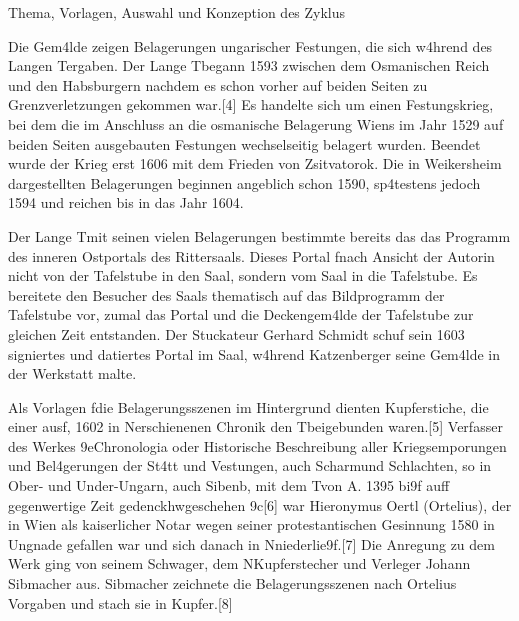 \documentclass[
  letterpaper,
]{book}
\begin{document}
Thema, Vorlagen, Auswahl und Konzeption des Zyklus

Die Gem\xa4lde zeigen Belagerungen ungarischer Festungen, die sich
w\xa4hrend des Langen T\xbcrkenkriegs ergaben. Der Lange
T\xbcrkenkrieg begann 1593 zwischen dem Osmanischen Reich und den
Habsburgern nachdem es schon vorher auf beiden Seiten zu
Grenzverletzungen gekommen war.{[}4{]} Es handelte sich um einen
Festungskrieg, bei dem die im Anschluss an die osmanische Belagerung
Wiens im Jahr 1529 auf beiden Seiten ausgebauten Festungen wechselseitig
belagert wurden. Beendet wurde der Krieg erst 1606 mit dem Frieden von
Zsitvatorok. Die in Weikersheim dargestellten Belagerungen beginnen
angeblich schon 1590, sp\xa4testens jedoch 1594 und reichen bis in
das Jahr 1604.

Der Lange T\xbcrkenkrieg mit seinen vielen Belagerungen bestimmte
bereits das das Programm des inneren Ostportals des Rittersaals. Dieses
Portal f\xbchrte nach Ansicht der Autorin nicht von der Tafelstube
in den Saal, sondern vom Saal in die Tafelstube. Es bereitete den
Besucher des Saals thematisch auf das Bildprogramm der Tafelstube vor,
zumal das Portal und die Deckengem\xa4lde der Tafelstube zur
gleichen Zeit entstanden. Der Stuckateur Gerhard Schmidt schuf sein 1603
signiertes und datiertes Portal im Saal, w\xa4hrend Katzenberger
seine Gem\xa4lde in der Werkstatt malte.

Als Vorlagen f\xbcr die Belagerungsszenen im Hintergrund dienten
Kupferstiche, die einer ausf\xbchrlichen, 1602 in
N\xbcrnberg erschienenen Chronik \xbcber den
T\xbcrkenkrieg beigebunden waren.{[}5{]} Verfasser des Werkes
\x9eChronologia oder Historische Beschreibung aller
Kriegsemporungen und Bel\xa4gerungen der St\xa4tt und Vestungen,
auch Scharm\xbctzeln und Schlachten, so in Ober- und Under-Ungarn,
auch Sibenb\xbcrgen, mit dem T\xbcrcken von A. 1395 bi\x9f
auff gegenwertige Zeit gedenckhw\xbcrdig geschehen
\x9c{[}6{]} war Hieronymus Oertl (Ortelius), der in
Wien als kaiserlicher Notar wegen seiner protestantischen Gesinnung 1580
in Ungnade gefallen war und sich danach in
N\xbcrnberg niederlie\x9f.{[}7{]} Die Anregung zu dem Werk ging
von seinem Schwager, dem N\xbcrnberger Kupferstecher und Verleger
Johann Sibmacher aus. Sibmacher zeichnete die Belagerungsszenen nach
Ortelius Vorgaben und stach sie in Kupfer.{[}8{]}
\end{document}
